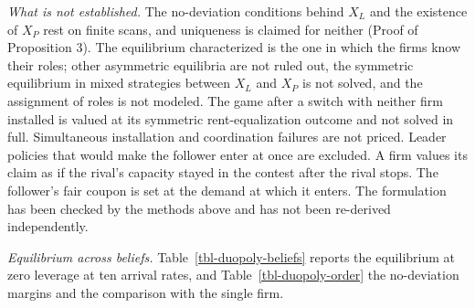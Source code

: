 \documentclass[
  11pt,
  letterpaper,
]{scrartcl}
\begin{document}
\emph{What is not established.} The no-deviation conditions behind
\(X_L\) and the existence of \(X_P\) rest on finite scans, and
uniqueness is claimed for neither (Proof of Proposition 3). The
equilibrium characterized is the one in which the firms know their
roles; other asymmetric equilibria are not ruled out, the symmetric
equilibrium in mixed strategies between \(X_L\) and \(X_P\) is not
solved, and the assignment of roles is not modeled. The game after a
switch with neither firm installed is valued at its symmetric
rent-equalization outcome and not solved in full. Simultaneous
installation and coordination failures are not priced. Leader policies
that would make the follower enter at once are excluded. A firm values
its claim as if the rival's capacity stayed in the contest after the
rival stops. The follower's fair coupon is set at the demand at which it
enters. The formulation has been checked by the methods above and has
not been re-derived independently.

\emph{Equilibrium across beliefs.} Table~\ref{tbl-duopoly-beliefs}
reports the equilibrium at zero leverage at ten arrival rates, and
Table~\ref{tbl-duopoly-order} the no-deviation margins and the
comparison with the single firm.

\begingroup\setlength{\tabcolsep}{3.5pt}
\end{document}
